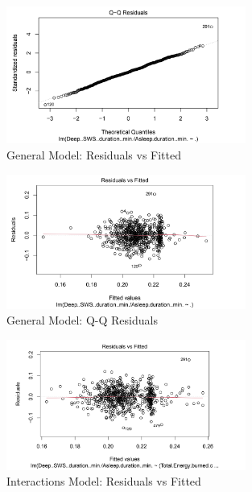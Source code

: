 \documentclass{article}
\begin{document}
\begin{figure}[h!]
  \centering
  \includegraphics[width=0.7\textwidth]{images/model_plot1.png}
  \caption{General Model: Residuals vs Fitted}
  \label{fig:general_residuals_vs_fitted}
\end{figure}

\begin{figure}[h!]
  \centering
  \includegraphics[width=0.7\textwidth]{images/model_plot2.png}
  \caption{General Model: Q-Q Residuals}
  \label{fig:general_qq_residuals}
\end{figure}

\begin{figure}[h!]
  \centering
  \includegraphics[width=0.7\textwidth]{images/model_rr_plot1.png}
  \caption{Interactions Model: Residuals vs Fitted}
  \label{fig:interactions_residuals_vs_fitted}
\end{figure}
\end{document}
